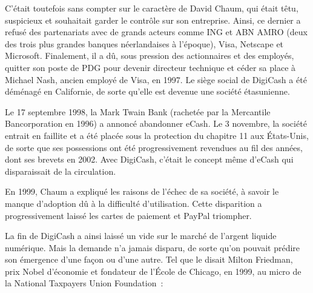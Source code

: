 C'était toutefois sans compter sur le caractère de David Chaum, qui était têtu, suspicieux et souhaitait garder le contrôle sur son entreprise. Ainsi, ce dernier a refusé des partenariats avec de grands acteurs comme ING et ABN AMRO (deux des trois plus grandes banques néerlandaises à l'époque), Visa, Netscape et Microsoft. Finalement, il a dû, sous pression des actionnaires et des employés, quitter son poste de PDG pour devenir directeur technique et céder sa place à Michael Nash, ancien employé de Visa, en 1997. Le siège social de DigiCash a été déménagé en Californie, de sorte qu'elle est devenue une société étasunienne.

Le 17 septembre 1998, la Mark Twain Bank (rachetée par la Mercantile Bancorporation en 1996) a annoncé abandonner eCash. Le 3 novembre, la société entrait en faillite et a été placée sous la protection du chapitre 11 aux États-Unis, de sorte que ses possessions ont été progressivement revendues au fil des années, dont ses brevets en 2002. Avec DigiCash, c'était le concept même d'eCash qui disparaissait de la circulation.

En 1999, Chaum a expliqué les raisons de l'échec de sa société, à savoir le manque d'adoption dû à la difficulté d'utilisation. Cette disparition a progressivement laissé les cartes de paiement et PayPal triompher.

La fin de DigiCash a ainsi laissé un vide sur le marché de l'argent liquide numérique. Mais la demande n'a jamais disparu, de sorte qu'on pouvait prédire son émergence d'une façon ou d'une autre. Tel que le disait Milton Friedman, prix Nobel d'économie et fondateur de l'École de Chicago, en 1999, au micro de la National Taxpayers Union Foundation~:


